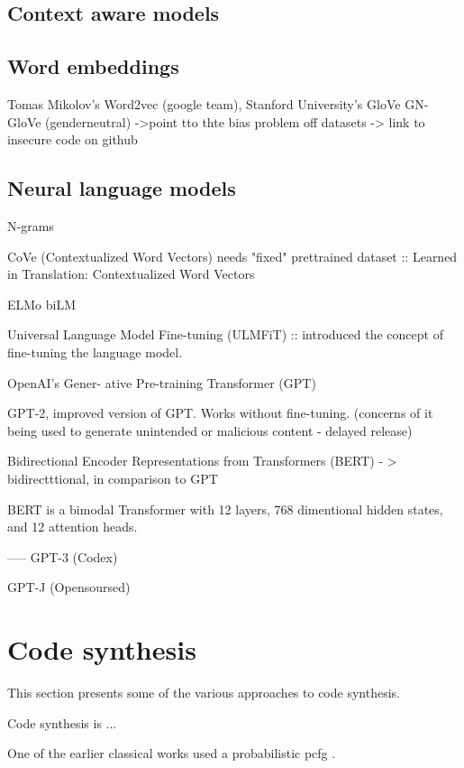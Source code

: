 \subsection{Context aware models}



\subsection{Word embeddings}



Tomas Mikolov's Word2vec (google team),
Stanford University's GloVe
GN-GloVe (genderneutral) ->point tto thte bias problem off datasets -> link to insecure code on  github



\subsection{Neural language models}
N-grams

CoVe (Contextualized Word Vectors) needs "fixed" prettrained dataset :: Learned in Translation: Contextualized Word Vectors

ELMo biLM

Universal Language Model Fine-tuning (ULMFiT) :: introduced the concept of fine-tuning the language model.

OpenAI’s Gener- ative Pre-training Transformer (GPT)

GPT-2, improved version of GPT. Works without fine-tuning. (concerns of it being used to generate unintended or malicious content - delayed release)

Bidirectional Encoder Representations from Transformers (BERT) - > bidirectttional, in comparison to GPT

BERT is a bimodal Transformer with 12 layers, 768 dimentional hidden states, and 12 attention heads.

-----
GPT-3 (Codex)

GPT-J (Opensoursed)


\section{Code synthesis}
This section presents some of the various approaches to code synthesis. 

Code synthesis is ... 

One of the earlier classical works used a probabilistic \acrfull{pcfg} \cite{allamanis2015bimodal}.

